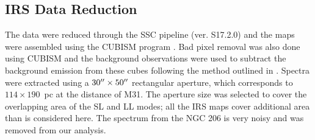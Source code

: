 \subsection{IRS Data Reduction}
\label{sect:irs_data}

The data were reduced through the SSC pipeline (ver. S17.2.0) and the maps were assembled using the CUBISM program \citep{Smith:2007fk}. 
Bad pixel removal was also done using CUBISM and the background observations were used to subtract the background emission from these cubes 
following the method outlined in \citet{Gordon:2008lr}. Spectra were extracted using a $30\hbox{$^{\prime\prime}$}\times50\hbox{$^{\prime\prime}$}$   rectangular aperture,
which corresponds to $114\times190$~pc at the distance of M31.
The aperture size was selected to cover the overlapping area of the SL and LL modes; all the IRS maps cover additional area than is considered here.
The spectrum from the NGC 206 is very noisy and was removed from our analysis. 


